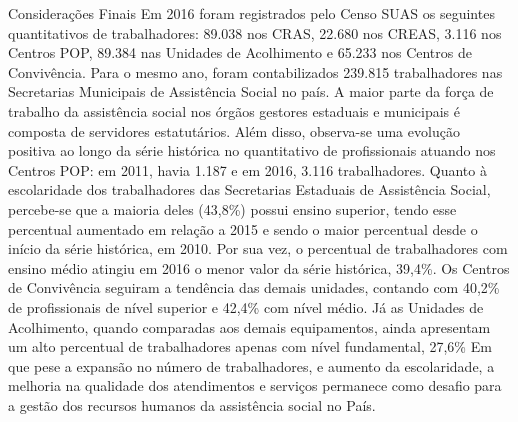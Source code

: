 \documentclass[
  brazilian]{report}
\begin{document}
Considerações Finais Em 2016 foram registrados pelo Censo SUAS os
seguintes quantitativos de trabalhadores: 89.038 nos CRAS, 22.680 nos
CREAS, 3.116 nos Centros POP, 89.384 nas Unidades de Acolhimento e
65.233 nos Centros de Convivência. Para o mesmo ano, foram
contabilizados 239.815 trabalhadores nas Secretarias Municipais de
Assistência Social no país. A maior parte da força de trabalho da
assistência social nos órgãos gestores estaduais e municipais é composta
de servidores estatutários. Além disso, observa-se uma evolução positiva
ao longo da série histórica no quantitativo de profissionais atuando nos
Centros POP: em 2011, havia 1.187 e em 2016, 3.116 trabalhadores. Quanto
à escolaridade dos trabalhadores das Secretarias Estaduais de
Assistência Social, percebe-se que a maioria deles (43,8\%) possui
ensino superior, tendo esse percentual aumentado em relação a 2015 e
sendo o maior percentual desde o início da série histórica, em 2010. Por
sua vez, o percentual de trabalhadores com ensino médio atingiu em 2016
o menor valor da série histórica, 39,4\%. Os Centros de Convivência
seguiram a tendência das demais unidades, contando com 40,2\% de
profissionais de nível superior e 42,4\% com nível médio. Já as Unidades
de Acolhimento, quando comparadas aos demais equipamentos, ainda
apresentam um alto percentual de trabalhadores apenas com nível
fundamental, 27,6\% Em que pese a expansão no número de trabalhadores, e
aumento da escolaridade, a melhoria na qualidade dos atendimentos e
serviços permanece como desafio para a gestão dos recursos humanos da
assistência social no País.
\end{document}

